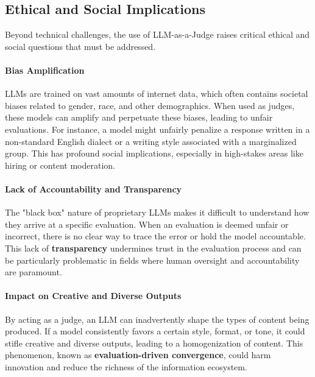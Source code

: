 \documentclass[acmsmall,screen]{acmart}
\begin{document}
\subsection{Ethical and Social Implications}
Beyond technical challenges, the use of LLM-as-a-Judge raises critical ethical and social questions that must be addressed.

\paragraph{\textbf{Bias Amplification}}
LLMs are trained on vast amounts of internet data, which often contains societal biases related to gender, race, and other demographics. When used as judges, these models can amplify and perpetuate these biases, leading to unfair evaluations. For instance, a model might unfairly penalize a response written in a non-standard English dialect or a writing style associated with a marginalized group. This has profound social implications, especially in high-stakes areas like hiring or content moderation.

\paragraph{\textbf{Lack of Accountability and Transparency}}
The "black box" nature of proprietary LLMs makes it difficult to understand how they arrive at a specific evaluation. When an evaluation is deemed unfair or incorrect, there is no clear way to trace the error or hold the model accountable. This lack of \textbf{transparency} undermines trust in the evaluation process and can be particularly problematic in fields where human oversight and accountability are paramount.

\paragraph{\textbf{Impact on Creative and Diverse Outputs}}
By acting as a judge, an LLM can inadvertently shape the types of content being produced. If a model consistently favors a certain style, format, or tone, it could stifle creative and diverse outputs, leading to a homogenization of content. This phenomenon, known as \textbf{evaluation-driven convergence}, could harm innovation and reduce the richness of the information ecosystem.
\end{document}
